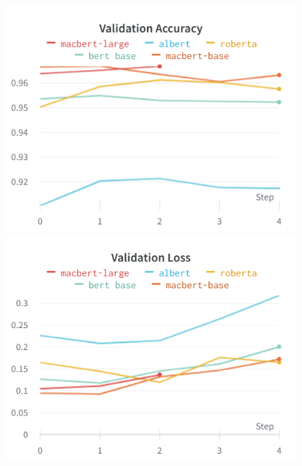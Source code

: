 \documentclass{homeworg}
\begin{document}
\begin{figure}[!htb]
\includegraphics[width=\linewidth]{charts/Section-7-Panel-2-po8yi2tav}
\endminipage\hfill
{}
\includegraphics[width=\linewidth]{charts/Section-7-Panel-3-w0h4uy3ed}
\endminipage
\end{figure}
\clearpage
\end{document}
